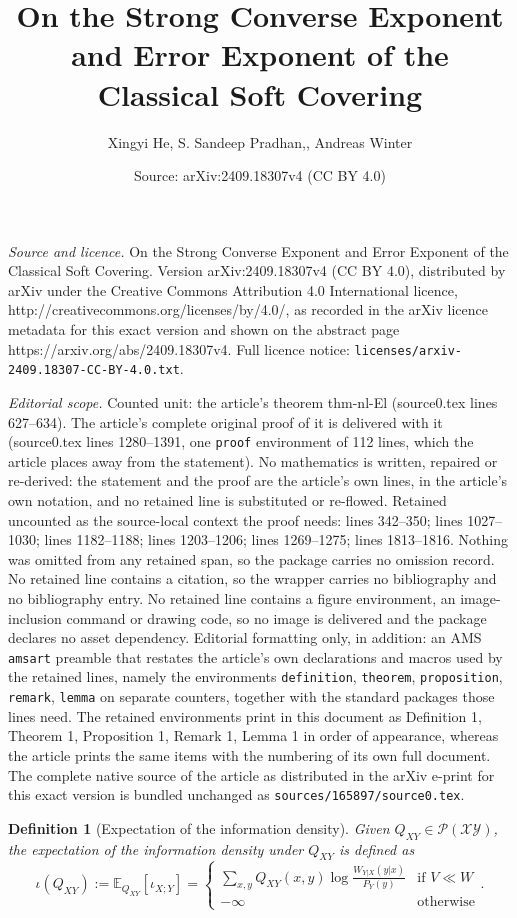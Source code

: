 \documentclass[10pt,a4paper]{amsart}
\title{On the Strong Converse Exponent and Error Exponent of the Classical Soft Covering\vspace{2ex}}
\author{Xingyi He, S. Sandeep Pradhan,, Andreas Winter}
\date{Source: arXiv:2409.18307v4 (CC BY 4.0)}
\newtheorem{definition}{Definition}
\newcommand{\mP}{\mathcal{P}}
\newcommand{\mX}{\mathcal{X}}
\newcommand{\mY}{\mathcal{Y}}
\begin{document}
\maketitle

\noindent\emph{Source and licence.} On the Strong Converse Exponent and Error Exponent of the Classical Soft Covering\vspace{2ex}. Version arXiv:2409.18307v4 (CC BY 4.0), distributed by arXiv under the Creative Commons Attribution 4.0 International licence, http://creativecommons.org/licenses/by/4.0/, as recorded in the arXiv licence metadata for this exact version and shown on the abstract page https://arxiv.org/abs/2409.18307v4. Full licence notice: \texttt{licenses/arxiv-2409.18307-CC-BY-4.0.txt}.\par\smallskip

\noindent\textit{Editorial scope.} Counted unit: the article's theorem thm-nl-El (source0.tex lines 627--634). The article's complete original proof of it is delivered with it (source0.tex lines 1280--1391, one \texttt{proof} environment of 112 lines, which the article places away from the statement). No mathematics is written, repaired or re-derived: the statement and the proof are the article's own lines, in the article's own notation, and no retained line is substituted or re-flowed.  Retained uncounted as the source-local context the proof needs: lines 342--350; lines 1027--1030; lines 1182--1188; lines 1203--1206; lines 1269--1275; lines 1813--1816.  Nothing was omitted from any retained span, so the package carries no omission record.  No retained line contains a citation, so the wrapper carries no bibliography and no bibliography entry.  No retained line contains a figure environment, an image-inclusion command or drawing code, so no image is delivered and the package declares no asset dependency.  Editorial formatting only, in addition: an AMS \texttt{amsart} preamble that restates the article's own declarations and macros used by the retained lines, namely the environments \texttt{definition}, \texttt{theorem}, \texttt{proposition}, \texttt{remark}, \texttt{lemma} on separate counters, together with the standard packages those lines need.  The retained environments print in this document as Definition 1, Theorem 1, Proposition 1, Remark 1, Lemma 1 in order of appearance, whereas the article prints the same items with the numbering of its own full document.  The complete native source of the article as distributed in the arXiv e-print for this exact version is bundled unchanged as \texttt{sources/165897/source0.tex}.
\begin{definition}[Expectation of the information density]\label{def-iQ}
    Given $Q_{XY}\in\mP(\mX\mY)$, the expectation of the information density under $Q_{XY}$ is defined as
    $$ \iota(Q_{XY}) := \mathbb{E}_{Q_{XY}} [\iota_{X;Y}] = 
    \begin{cases}
        \displaystyle{ \sum_{x,y} Q_{XY}(x,y) \log\frac{W_{Y|X}(y|x)}{P_Y(y)} } 
            & \text{if } V\ll W \\
        -\infty & \text{otherwise}
    \end{cases}. $$
\end{definition}
\end{document}
